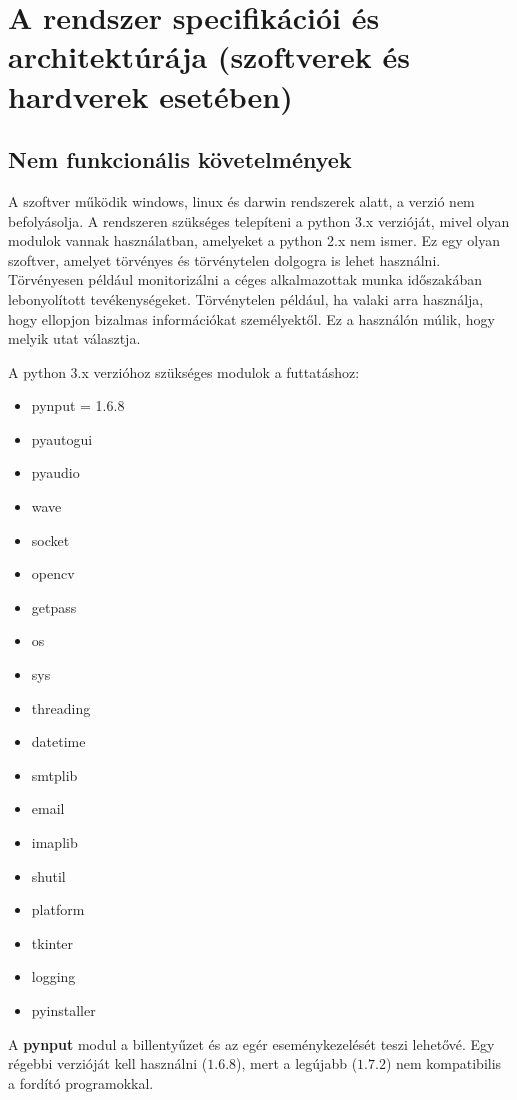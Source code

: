 \documentclass[a4paper, 11pt]{article}
\begin{document}
\section{A rendszer specifikációi és architektúrája (szoftverek és hardverek esetében)}\label{sec:specs_and_arch}

\subsection{Nem funkcionális követelmények}
A szoftver működik windows, linux és darwin rendszerek alatt, a verzió nem befolyásolja. A rendszeren szükséges telepíteni a python 3.x verzióját, mivel olyan modulok vannak használatban, amelyeket a python 2.x nem ismer. Ez egy olyan szoftver, amelyet törvényes és törvénytelen dolgogra is lehet használni. Törvényesen például monitorizálni a céges alkalmazottak munka időszakában lebonyolított tevékenységeket. Törvénytelen például, ha valaki arra használja, hogy ellopjon bizalmas információkat személyektől. Ez a használón múlik, hogy melyik utat választja.

A python 3.x verzióhoz szükséges modulok a futtatáshoz:
\begin{multicols}{2}
\begin{itemize}
\item pynput = 1.6.8
\item pyautogui
\item pyaudio
\item wave
\item socket
\item opencv
\item getpass
\item os
\item sys
\item threading
\item datetime
\item smtplib
\item email
\item imaplib
\item shutil
\item platform
\item tkinter
\item logging
\item pyinstaller
\end{itemize}
\end{multicols}
\cleardoublepage
A \textbf{pynput} modul a billentyűzet és az egér eseménykezelését teszi lehetővé. Egy régebbi verzióját kell használni ($1.6.8$), mert a legújabb ($1.7.2$) nem kompatibilis a fordító programokkal.
\end{document}
